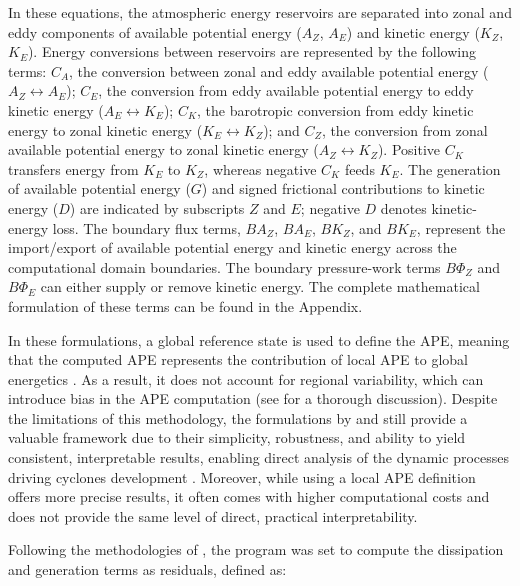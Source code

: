 \documentclass[pdflatex,sn-chicago]{sn-jnl}%
\theoremstyle{plain}
\theoremstyle{definition}
\theoremstyle{remark}
\theoremstyle{definition}
\begin{document}
In these equations, the atmospheric energy reservoirs are separated into zonal and eddy components of available potential energy (\(A_Z\), \(A_E\)) and kinetic energy (\(K_Z\), \(K_E\)). Energy conversions between reservoirs are represented by the following terms: \(C_A\), the conversion between zonal and eddy available potential energy (\(A_Z \leftrightarrow A_E\)); \(C_E\), the conversion from eddy available potential energy to eddy kinetic energy (\(A_E \leftrightarrow K_E\)); \(C_K\), the barotropic conversion from eddy kinetic energy to zonal kinetic energy (\(K_E \leftrightarrow K_Z\)); and \(C_Z\), the conversion from zonal available potential energy to zonal kinetic energy (\(A_Z \leftrightarrow K_Z\)). Positive \(C_K\) transfers energy from \(K_E\) to \(K_Z\), whereas negative \(C_K\) feeds \(K_E\). The generation of available potential energy (\(G\)) and signed frictional contributions to kinetic energy (\(D\)) are indicated by subscripts \(Z\) and \(E\); negative \(D\) denotes kinetic-energy loss. The boundary flux terms, \(BA_Z\), \(BA_E\), \(BK_Z\), and \(BK_E\), represent the import/export of available potential energy and kinetic energy across the computational domain boundaries. The boundary pressure-work terms \(B\Phi_Z\) and \(B\Phi_E\) can either supply or remove kinetic energy. The complete mathematical formulation of these terms can be found in the Appendix.


In these formulations, a global reference state is used to define the APE, meaning that the computed APE represents the contribution of local APE to global energetics \citep{smith1980energetics}. As a result, it does not account for regional variability, which can introduce bias in the APE computation (see \citet{novak2018local} for a thorough discussion). Despite the limitations of this methodology, the formulations by \citet{muench1965dynamics} and \citet{brennan1980zonal} still provide a valuable framework due to their simplicity, robustness, and ability to yield consistent, interpretable results, enabling direct analysis of the dynamic processes driving cyclones development \citep[][e.g.]{dias2011energy, de2025revisiting}. Moreover, while using a local APE definition \citep[][e.g.]{novak2018local} offers more precise results, it often comes with higher computational costs and does not provide the same level of direct, practical interpretability.

Following the methodologies of \citet{brennan1980zonal,michaelides1987limited,veiga2008analysis,pezza2010environmental,dias2011energy}, the program was set to compute the dissipation and generation terms as residuals, defined as:
\end{document}
